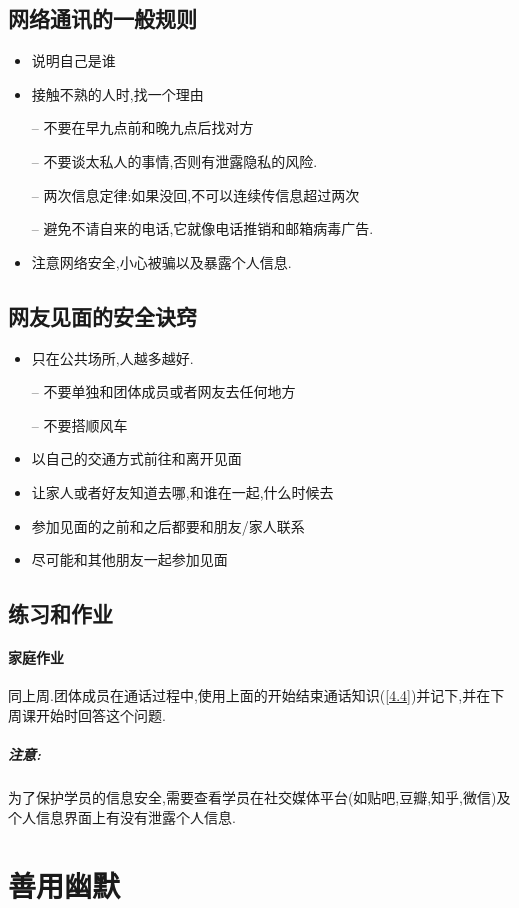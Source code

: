 \documentclass[UTF8]{article}
\newcommand{\Exer}{\subsection{练习和作业}}
\newcommand{\exer}{\paragraph*{家庭作业}}
\newcommand{\warn}{\subparagraph*{注意:}}
\newcommand{\dash}{–}
\begin{document}
\subsection{网络通讯的一般规则}
\begin{itemize}
    \item 说明自己是谁
    \item 接触不熟的人时,找一个理由
    \item[\dash] 不要在早九点前和晚九点后找对方
    \item[\dash] 不要谈太私人的事情,否则有泄露隐私的风险.
    \item[\dash] 两次信息定律:如果没回,不可以连续传信息超过两次
    \item[\dash] 避免不请自来的电话,它就像电话推销和邮箱病毒广告.
    \item 注意网络安全,小心被骗以及暴露个人信息.
\end{itemize}

\subsection{网友见面的安全诀窍}
\begin{itemize}
    \item 只在公共场所,人越多越好.
    \item[\dash] 不要单独和团体成员或者网友去任何地方
    \item[\dash] 不要搭顺风车
    \item 以自己的交通方式前往和离开见面
    \item 让家人或者好友知道去哪,和谁在一起,什么时候去
    \item 参加见面的之前和之后都要和朋友/家人联系
    \item 尽可能和其他朋友一起参加见面
\end{itemize}

\Exer \exer 同上周.团体成员在通话过程中,使用上面的开始结束通话知识(\ref{4.4})并记下,并在下周课开始时回答这个问题.
\warn 为了保护学员的信息安全,需要查看学员在社交媒体平台(如贴吧,豆瓣,知乎,微信)及个人信息界面上有没有泄露个人信息.

\section{善用幽默}
\end{document}
